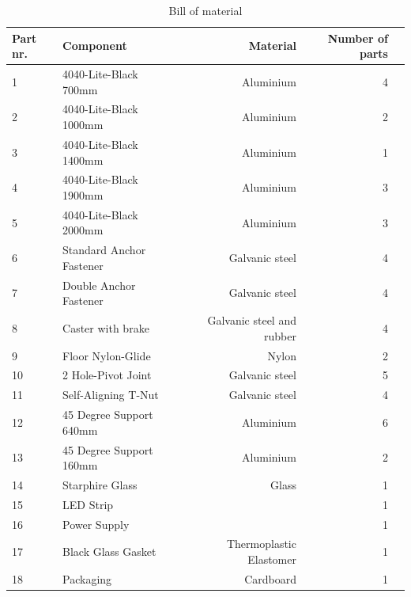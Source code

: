 \documentclass[a4paper]{jpconf}
\begin{document}
\begin{table}[]
	\centering
	\begin{tabular}{llrrr}
		
		Part nr. & Component & Material & Number of parts  \\
		\hline
		1&4040-Lite-Black 700mm  & Aluminium  & 4  \\
		2&4040-Lite-Black 1000mm & Aluminium &  2\\
		3&4040-Lite-Black 1400mm & Aluminium & 1  \\
		4&4040-Lite-Black 1900mm & Aluminium & 3  \\
		5&4040-Lite-Black 2000mm  & Aluminium &3  \\
		6&Standard Anchor Fastener  & Galvanic steel&4  \\
		7&Double Anchor Fastener  &Galvanic steel & 4  \\
		8&Caster with brake  & Galvanic steel and rubber & 4  \\
		9&Floor Nylon-Glide  & Nylon& 2 \\
		10&2 Hole-Pivot Joint  & Galvanic steel & 5  \\
		11&Self-Aligning T-Nut  & Galvanic steel &4   \\
		12&45 Degree Support 640mm  & Aluminium &  6 \\
		13&45 Degree Support 160mm  & Aluminium & 2  \\
		14&Starphire Glass& Glass &1\\
		15&LED Strip& & 1\\
		16&Power Supply & & 1 \\
		17&Black Glass Gasket & Thermoplastic Elastomer & 1\\
		18&Packaging & Cardboard & 1  \\ %
	\end{tabular}
	\caption{Bill of material }
	\label{tab:BOM}
\end{table}
\end{document}
